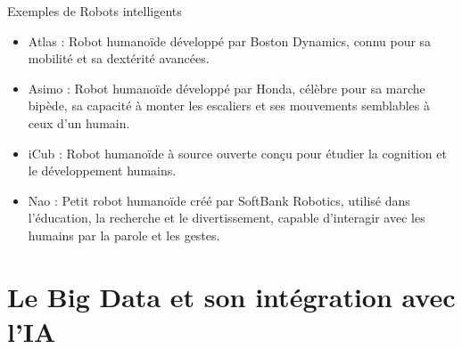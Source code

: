 \documentclass{beamer}
\begin{document}
\begin{frame}{Exemples de Robots intelligents}
	\begin{itemize}
		\item Atlas : Robot humanoïde développé par Boston Dynamics, connu pour sa mobilité et sa dextérité avancées.
		\item Asimo : Robot humanoïde développé par Honda, célèbre pour sa marche bipède, sa capacité à monter les escaliers et ses mouvements semblables à ceux d'un humain.
		\item iCub : Robot humanoïde à source ouverte conçu pour étudier la cognition et le développement humains.
		\item Nao : Petit robot humanoïde créé par SoftBank Robotics, utilisé dans l'éducation, la recherche et le divertissement, capable d'interagir avec les humains par la parole et les gestes.
	\end{itemize}
\end{frame}







\begin{frame}[plain]
	\centering
\end{frame}

\section{Le Big Data et son intégration avec l'IA}
\end{document}
